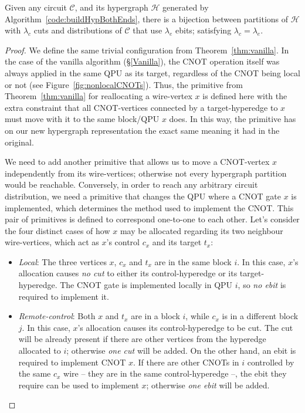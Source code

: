 \begin{theorem}
 Given any circuit \(\mathcal{C}\), and its hypergraph \(\mathcal{H}\) generated by Algorithm~\ref{code:buildHypBothEnds}, there is a bijection between partitions of \(\mathcal{H}\) with \(\lambda_c\) cuts and distributions of \(\mathcal{C}\) that use \(\lambda_e\) ebits; satisfying \(\lambda_c = \lambda_e\).
 \label{thm:bothEnds}
\end{theorem}
\begin{proof}
We define the same trivial configuration from Theorem~\ref{thm:vanilla}. In the case of the vanilla algorithm (\S\ref{Vanilla}), the CNOT operation itself was always applied in the same QPU as its target, regardless of the CNOT being local or not (see Figure~\ref{fig:nonlocalCNOTs}). Thus, the primitive from Theorem~\ref{thm:vanilla} for reallocating a wire-vertex \(x\) is defined here with the extra constraint that all CNOT-vertices connected by a target-hyperedge to \(x\) must move with it to the same block/QPU \(x\) does. In this way, the primitive has on our new hypergraph representation the exact same meaning it had in the original. 

We need to add another primitive that allows us to move a CNOT-vertex \(x\) independently from its wire-vertices; otherwise not every hypergraph partition would be reachable. Conversely, in order to reach any arbitrary circuit distribution, we need a primitive that changes the QPU where a CNOT gate \(x\) is implemented, which determines the method used to implement the CNOT. This pair of primitives is defined to correspond one-to-one to each other. Let's consider the four distinct cases of how \(x\) may be allocated regarding its two neighbour wire-vertices, which  act as \(x\)'s control \(c_x\) and its target \(t_x\):
\begin{itemize}
  \item \textit{Local}: The three vertices \(x\), \(c_x\) and \(t_x\) are in the same block \(i\). In this case, \(x\)'s allocation causes \textit{no cut} to either its control-hyperedge or its target-hyperedge. The CNOT gate is implemented locally in QPU \(i\), so \textit{no ebit} is required to implement it.

  \item \textit{Remote-control}: Both \(x\) and \(t_x\) are in a block \(i\), while \(c_x\) is in a different block \(j\). In this case, \(x\)'s allocation causes its control-hyperedge to be cut. The cut will be already present if there are other vertices from the hyperedge allocated to \(i\); otherwise \textit{one cut} will be added. On the other hand, an ebit is required to implement CNOT \(x\). If there are other CNOTs in \(i\) controlled by the same \(c_x\) wire -- they are in the same control-hyperedge --, the ebit they require can be used to implement \(x\); otherwise \textit{one ebit} will be added.


\end{itemize}
\end{proof}
